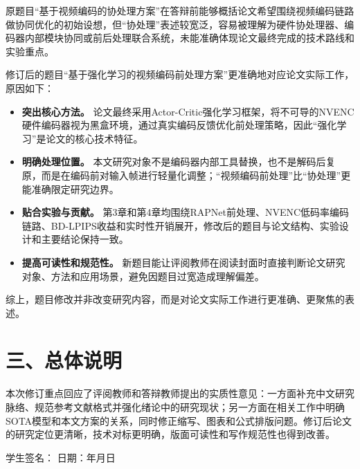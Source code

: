 \documentclass[UTF8,zihao=-4]{ctexart}
\begin{document}
原题目“基于视频编码的协处理方案”在答辩前能够概括论文希望围绕视频编码链路做协同优化的初始设想，但“协处理”表述较宽泛，容易被理解为硬件协处理器、编码器内部模块协同或前后处理联合系统，未能准确体现论文最终完成的技术路线和实验重点。

修订后的题目“基于强化学习的视频编码前处理方案”更准确地对应论文实际工作，原因如下：

\begin{itemize}
  \item \textbf{突出核心方法。} 论文最终采用Actor-Critic强化学习框架，将不可导的NVENC硬件编码器视为黑盒环境，通过真实编码反馈优化前处理策略，因此“强化学习”是论文的核心技术特征。
  \item \textbf{明确处理位置。} 本文研究对象不是编码器内部工具替换，也不是解码后复原，而是在编码前对输入帧进行轻量化调整；“视频编码前处理”比“协处理”更能准确限定研究边界。
  \item \textbf{贴合实验与贡献。} 第3章和第4章均围绕RAPNet前处理、NVENC低码率编码链路、BD-LPIPS收益和实时性开销展开，修改后的题目与论文结构、实验设计和主要结论保持一致。
  \item \textbf{提高可读性和规范性。} 新题目能让评阅教师在阅读封面时直接判断论文研究对象、方法和应用场景，避免因题目过宽造成理解偏差。
\end{itemize}

综上，题目修改并非改变研究内容，而是对论文实际工作进行更准确、更聚焦的表述。

\section*{三、总体说明}

本次修订重点回应了评阅教师和答辩教师提出的实质性意见：一方面补充中文研究脉络、规范参考文献格式并强化绪论中的研究现状；另一方面在相关工作中明确SOTA模型和本文方案的关系，同时修正缩写、图表和公式排版问题。修订后论文的研究定位更清晰，技术对标更明确，版面可读性和写作规范性也得到改善。

\vspace{2em}
\noindent 学生签名：\hspace{5cm} 日期：\hspace{3cm}年\hspace{1cm}月\hspace{1cm}日
\end{document}
